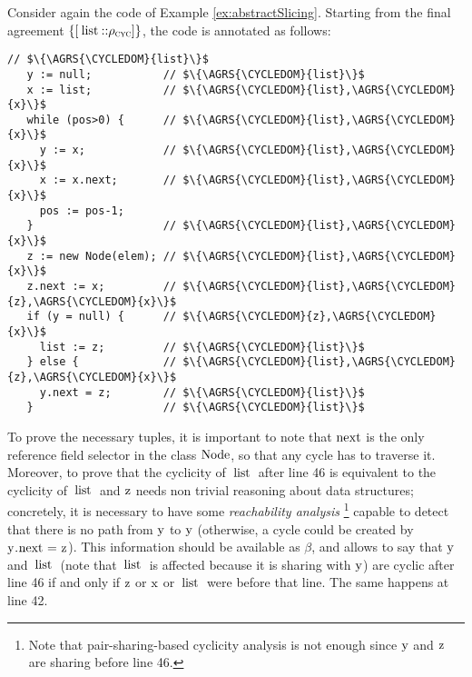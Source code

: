 \documentclass[prodmode,acmtocl]{acmsmall}
\def\uco{\ensuremath{\rho}\xspace}
\newcommand{\0}{\mbox{\bf 0}}
\newcommand{\CODE}[1]{\ensuremath{\mbox{\lstinline!#1!}\xspace}\xspace}
\def\CYCLEDOM{\ensuremath{\uco_{\textsc{cyc}}}\xspace}
\def\PRED{\beta}
\newcommand{\AGRS}[2]{[#2{::}#1]}
\begin{document}
\begin{example}
  Consider again the code of Example \ref{ex:abstractSlicing}.
  Starting from the final agreement $\{ \AGRS{\CYCLEDOM}{\mbox{\CODE{list}}}
  \}$, the code is annotated as follows:

  {\em
    \begin{lstlisting}[firstnumber=33]
                        // $\{\AGRS{\CYCLEDOM}{list}\}$
   y := null;           // $\{\AGRS{\CYCLEDOM}{list}\}$
   x := list;           // $\{\AGRS{\CYCLEDOM}{list},\AGRS{\CYCLEDOM}{x}\}$
   while (pos>0) {      // $\{\AGRS{\CYCLEDOM}{list},\AGRS{\CYCLEDOM}{x}\}$
     y := x;            // $\{\AGRS{\CYCLEDOM}{list},\AGRS{\CYCLEDOM}{x}\}$
     x := x.next;       // $\{\AGRS{\CYCLEDOM}{list},\AGRS{\CYCLEDOM}{x}\}$
     pos := pos-1;
   }                    // $\{\AGRS{\CYCLEDOM}{list},\AGRS{\CYCLEDOM}{x}\}$
   z := new Node(elem); // $\{\AGRS{\CYCLEDOM}{list},\AGRS{\CYCLEDOM}{x}\}$
   z.next := x;         // $\{\AGRS{\CYCLEDOM}{list},\AGRS{\CYCLEDOM}{z},\AGRS{\CYCLEDOM}{x}\}$
   if (y = null) {      // $\{\AGRS{\CYCLEDOM}{z},\AGRS{\CYCLEDOM}{x}\}$
     list := z;         // $\{\AGRS{\CYCLEDOM}{list}\}$
   } else {             // $\{\AGRS{\CYCLEDOM}{list},\AGRS{\CYCLEDOM}{z},\AGRS{\CYCLEDOM}{x}\}$
     y.next = z;        // $\{\AGRS{\CYCLEDOM}{list}\}$
   }                    // $\{\AGRS{\CYCLEDOM}{list}\}$
    \end{lstlisting}
  }

  \noindent To prove the necessary tuples, it is important to note
  that \CODE{next} is the only reference field selector in the class
  \CODE{Node}, so that any cycle has to traverse it.  Moreover, to
  prove that the cyclicity of \CODE{list} after line 46 is equivalent
  to the cyclicity of \CODE{list} and \CODE{z} needs non trivial
  reasoning about data structures; concretely, it is necessary to have
  some \emph{reachability analysis} \cite{tcs13}\footnote{Note that
    pair-sharing-based cyclicity analysis
    \cite{DBLP:conf/vmcai/RossignoliS06} is not enough since \CODE{y}
    and \CODE{z} are sharing before line 46.} capable to detect that
  there is no path from \CODE{y} to \CODE{y} (otherwise, a cycle could
  be created by \CODE{y.next = z}).  This information should be
  available as $\PRED$, and allows to say that \CODE{y} and
  \CODE{list} (note that \CODE{list} is affected because it is sharing
  with \CODE{y}) are cyclic after line 46 if and only if \CODE{z} or
  \CODE{x} or \CODE{list} were before that line.  The same happens at
  line 42.
  

\end{example}
\end{document}

